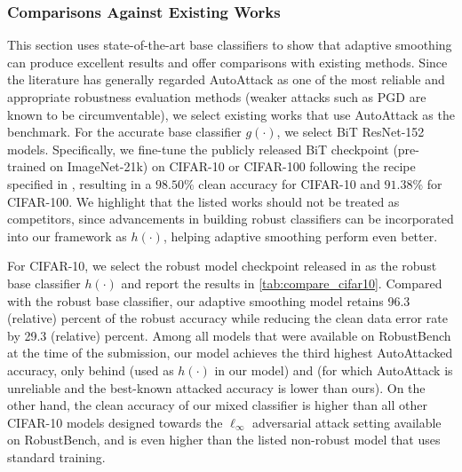 \documentclass[11pt, letterpaper]{article}
\theoremstyle{plain}
\theoremstyle{definition}
\begin{document}
\subsubsection{Comparisons Against Existing Works} \label{sec:adap_exp_compare}

This section uses state-of-the-art base classifiers to show that adaptive smoothing can produce excellent results and offer comparisons with existing methods. Since the literature has generally regarded AutoAttack \citep{Croce20a} as one of the most reliable and appropriate robustness evaluation methods (weaker attacks such as PGD are known to be circumventable), we select existing works that use AutoAttack as the benchmark. For the accurate base classifier $g (\cdot)$, we select BiT \citep{Kolesnikov20} ResNet-152 models. Specifically, we fine-tune the publicly released BiT checkpoint (pre-trained on ImageNet-21k) on CIFAR-10 or CIFAR-100 following the recipe specified in \citep{Kolesnikov20}, resulting in a $98.50 \%$ clean accuracy for CIFAR-10 and $91.38 \%$ for CIFAR-100. We highlight that the listed works should not be treated as competitors, since advancements in building robust classifiers can be incorporated into our framework as $h (\cdot)$, helping adaptive smoothing perform even better.

For CIFAR-10, we select the robust model checkpoint released in \citep{Wang23} as the robust base classifier $h (\cdot)$ and report the results in \cref{tab:compare_cifar10}. Compared with the robust base classifier, our adaptive smoothing model retains 96.3 (relative) percent of the robust accuracy while reducing the clean data error rate by 29.3 (relative) percent. Among all models that were available on RobustBench at the time of the submission, our model achieves the third highest AutoAttacked accuracy, only behind \citep{Wang23} (used as $h (\cdot)$ in our model) and \citep{Kang21} (for which AutoAttack is unreliable and the best-known attacked accuracy is lower than ours). On the other hand, the clean accuracy of our mixed classifier is higher than all other CIFAR-10 models designed towards the $\ell_\infty$ adversarial attack setting available on RobustBench, and is even higher than the listed non-robust model that uses standard training.
\end{document}
